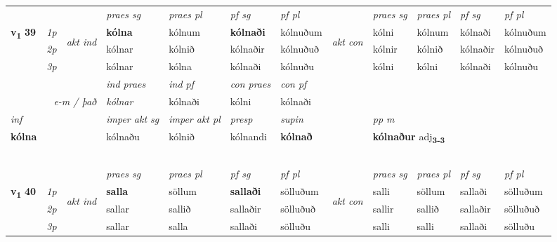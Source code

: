 \begin{longtable}[l]{X>{\footnotesize\itshape}llXXXXlXXXX}
 & &   & \textit{praes sg}  & \textit{praes pl}    & \textit{ pf sg} & \textit{pf pl} & & \textit{praes sg}  & \textit{praes pl}    & \textit{pf sg} & \textit{pf pl }  \\ \cmidrule{4-7} \cmidrule{9-12}
 \multirow{2}{*}{{{\textbf{v{\textsubscript{1}}} \Large{\textbf{39}}}}}  & 1p & \multirow{3}{*}{\begin{turn}{90}\textit{akt ind}\end{turn}} & \textbf{kólna} & kólnum & \textbf{kólnaði} & kólnuðum & \multirow{3}{*}{\begin{turn}{90}\textit{akt con}\end{turn}} &kólni & kólnum & kólnaði & kólnuðum\\*
 & 2p &  &  kólnar  & kólnið & kólnaðir & kólnuðuð & & kólnir & kólnið & kólnaðir & kólnuðuð \\*
 & 3p &  & kólnar & kólna & kólnaði & kólnuðu & & kólni & kólni& kólnaði & kólnuðu \\*
\cmidrule{4-7} \cmidrule{9-12}

   && &  \textit{ind praes} & \textit{ind pf} & \textit{con praes} & \textit{con pf} \\*
\multicolumn{3}{r}{\textit{e-m / það}} & kólnar & kólnaði & kólni & kólnaði \\*

\cmidrule{4-7}
   {\textit{inf}} & &  & \textit{imper akt sg} & \textit{imper akt pl}   & \textit{presp} & \textit{supin}  && \textit{pp m} \\*
  {\textbf{kólna}} & && kólnaðu  & kólnið   & kólnandi &  \textbf{kólnað}  && \multicolumn{2}{l}{\textbf{kólnaður} adj\textbf{\textsubscript{3-3}}} \\*

\midrule
& \\*
& \\*
& \\*
& \\*
& \\
\midrule

 & &   & \textit{praes sg}  & \textit{praes pl}    & \textit{ pf sg} & \textit{pf pl} & & \textit{praes sg}  & \textit{praes pl}    & \textit{pf sg} & \textit{pf pl }  \\ \cmidrule{4-7} \cmidrule{9-12}
 \multirow{2}{*}{{{\textbf{v{\textsubscript{1}}} \Large{\textbf{40}}}}}  & 1p & \multirow{3}{*}{\begin{turn}{90}\textit{akt ind}\end{turn}} & \textbf{salla} & söllum & \textbf{sallaði} & sölluðum & \multirow{3}{*}{\begin{turn}{90}\textit{akt con}\end{turn}} &salli & söllum & sallaði & sölluðum\\*
 & 2p &  &  sallar  & sallið & sallaðir & sölluðuð & & sallir & sallið & sallaðir & sölluðuð \\*
 & 3p &  & sallar & salla & sallaði & sölluðu & & salli & salli& sallaði & sölluðu \\*
\cmidrule{4-7} \cmidrule{9-12}


\end{longtable}

